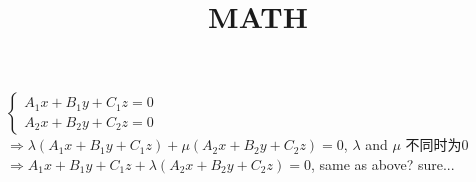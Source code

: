 \message{ !name(math.tex)}\documentclass[12pt]{article}
\title{MATH}
\begin{document}
$
\left \{
    \begin{array}{l}
      A_1x+B_1y+C_1z=0\\
      A_2x+B_2y+C_2z=0
    \end{array}
  \right.
$\\
$\Rightarrow
\lambda(A_1x+B_1y+C_1z) + \mu(A_2x+B_2y+C_2z)=0$, $\lambda$ and $\mu$ 不同时为0\\
$\Rightarrow A_1x+B_1y+C_1z+\lambda(A_2x+B_2y+C_2z)=0$, same as above? sure...

\end{document}
